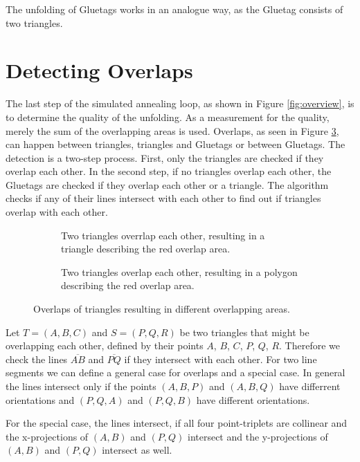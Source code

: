 \documentclass[draft,final]{vutinfth} %
\begin{document}
The unfolding of Gluetags works in an analogue way, as the Gluetag consists of two triangles.

\section{Detecting Overlaps}
\label{sec:overlaps}
The last step of the simulated annealing loop, as shown in Figure \ref{fig:overview}, is to determine the quality of the unfolding. As a measurement for the quality, merely the sum of the overlapping areas is used. Overlaps, as seen in Figure \ref{fig:overlap}, can happen between triangles, triangles and Gluetags or between Gluetags. The detection is a two-step process. First, only the triangles are checked if they overlap each other. In the second step, if no triangles overlap each other, the Gluetags are checked if they overlap each other or a triangle. The algorithm checks if any of their lines intersect with each other to find out if triangles overlap with each other.

\begin{figure}
\centering
\begin{subfigure}[t]{.4\textwidth}
	
  \caption{Two triangles overrlap each other, resulting in a triangle describing the red overlap area.}
	\label{fig:overlap1}
\end{subfigure}%
\hspace{.1\textwidth}
\begin{subfigure}[t]{.4\textwidth}
	
	\caption{Two triangles overlap each other, resulting in a polygon describing the red overlap area.}
	\label{fig:overlap2}
\end{subfigure}
\caption{Overlaps of triangles resulting in different overlapping areas.}
\label{fig:overlap}
\end{figure}

Let $T = (A,B,C)$ and $S = (P,Q,R)$ be two triangles that might be overlapping each other, defined by their points $A$, $B$, $C$, $P$, $Q$, $R$. Therefore we check the lines $\overline{AB}$ and $\overline{PQ}$ if they intersect with each other. For two line segments we can define a general case for overlaps and a special case. In general the lines intersect only if the points $(A,B,P)$ and $(A,B,Q)$ have differrent orientations and $(P,Q,A)$ and $(P,Q,B)$ have different orientations.

For the special case, the lines intersect, if all four point-triplets are collinear and the x-projections of $(A,B)$ and $(P,Q)$ intersect and the y-projections of $(A,B)$ and $(P,Q)$ intersect as well.
\end{document}
